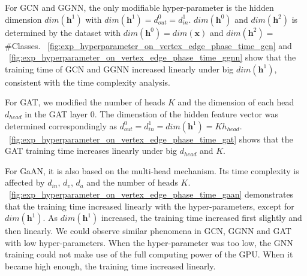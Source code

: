 For GCN and GGNN, the only modifiable hyper-parameter is the hidden dimension $dim(\boldsymbol{h}^1)$ with $dim(\boldsymbol{h}^1) = d^0_{out} = d^1_{in}$.
$dim(\boldsymbol{h}^0)$ and $dim(\boldsymbol{h}^2)$ is determined by the dataset with $dim(\boldsymbol{h}^0)=dim(\boldsymbol{x})$ and $dim(\boldsymbol{h}^2)=$\#Classes.
\figurename~\ref{fig:exp_hyperparameter_on_vertex_edge_phase_time_gcn} and \figurename~\ref{fig:exp_hyperparameter_on_vertex_edge_phase_time_ggnn} show that the training time of GCN and GGNN increased linearly under big $dim(\boldsymbol{h}^1)$, consistent with the time complexity analysis.

For GAT, we modified the number of heads $K$ and the dimension of each head $d_{head}$ in the GAT layer 0.
The dimenstion of the hidden feature vector was determined correspondingly as $d^0_{out} = d^1_{in} = dim(\boldsymbol{h}^1) = K h_{head}$.
\figurename~\ref{fig:exp_hyperparameter_on_vertex_edge_phase_time_gat} shows that the GAT training time increases linearly under big $d_{head}$ and $K$.

For GaAN, it is also based on the multi-head mechanism.
Its time complexity is affected by $d_{in}$, $d_v$, $d_a$ and the number of heads $K$.
\figurename~\ref{fig:exp_hyperparameter_on_vertex_edge_phase_time_gaan} demonstrates that the training time increased linearly with the hyper-parameters, except for $dim(\boldsymbol{h}^1)$.
As $dim(\boldsymbol{h}^1)$ increased, the training time increased first slightly and then linearly.
We could observe similar phenomena in GCN, GGNN and GAT with low hyper-parameters.
When the hyper-parameter was too low, the GNN training could not make use of the full computing power of the GPU.
When it became high enough, the training time increased linearly.

